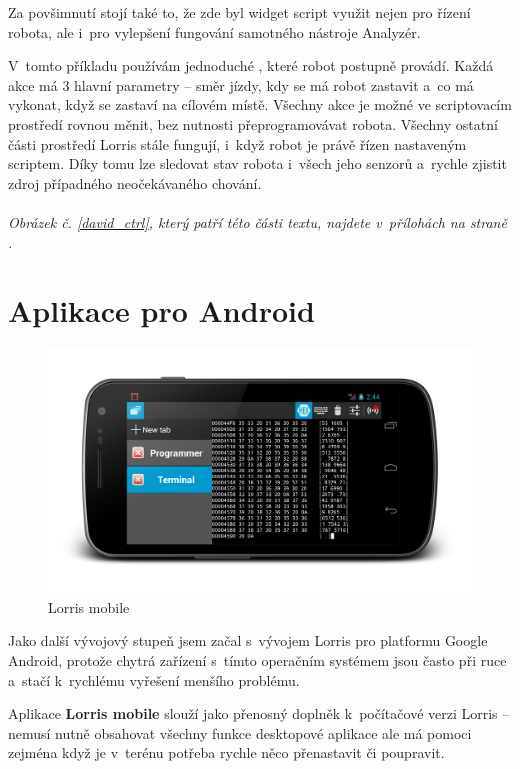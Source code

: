 \documentclass[12pt, a4paper, oneside]{article}
\newcommand{\It}{\textit}  %
\begin{document}
Za povšimnutí stojí také to, že zde byl widget script využit nejen pro řízení robota, ale i~pro vylepšení fungování samotného nástroje Analyzér.

V~tomto příkladu používám jednoduché , které robot postupně provádí. Každá akce má 3 hlavní parametry -- směr jízdy, kdy se má robot zastavit a~co má vykonat, když se zastaví na cílovém místě. Všechny akce je možné ve scriptovacím prostředí rovnou měnit, bez nutnosti přeprogramovávat robota. Všechny ostatní části prostředí Lorris stále fungují, i~když robot je právě řízen nastaveným scriptem. Díky tomu lze sledovat stav robota i~všech jeho senzorů a~rychle zjistit zdroj případného neočekávaného chování.
\\
\\
\noindent\It{Obrázek č. \ref{david_ctrl}, který patří této části textu, najdete v~přílohách na straně \pageref{david_ctrl}.}

\newpage
\section{Aplikace pro Android}
\begin{figure}[H]
\begin{center}
\includegraphics[width=\textwidth]{img/mobile.png}
\caption{Lorris mobile}
\end{center}
\end{figure}
Jako další vývojový stupeň jsem začal s~vývojem Lorris pro platformu Google Android\cite{android}, protože chytrá zařízení s~tímto operačním systémem jsou často při ruce a~stačí k~rychlému vyřešení menšího problému.

Aplikace {\bf Lorris mobile} slouží jako přenosný doplněk k~počítačové verzi Lorris -- nemusí nutně obsahovat všechny funkce desktopové aplikace ale má pomoci zejména když je v~terénu potřeba rychle něco přenastavit či poupravit.
\end{document}
